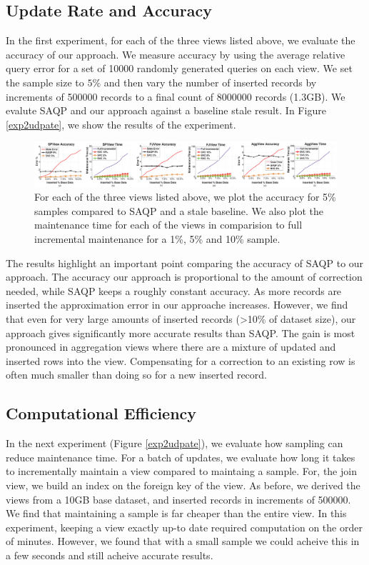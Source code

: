\subsection{Update Rate and Accuracy}
In the first experiment, for each of the three views listed above, we evaluate the accuracy of our approach.
We measure accuracy by using the average relative query error for a set of 10000 randomly generated queries on each view.
We set the sample size to $5\%$ and then vary the number of inserted records by increments of 500000 records to a final count of 8000000 records (1.3GB).
We evalute SAQP and our approach against a baseline stale result.
In Figure \ref{exp2udpate}, we show the results of the experiment. 

\begin{figure}[ht!]
\label{exp2update}
\centering
 \includegraphics[scale=0.30]{exp/exp2-full.eps}
 \caption{For each of the three views listed above, we plot the accuracy for 5\% samples compared to SAQP and a stale baseline. We also plot the maintenance time for each of the views in comparision to full incremental maintenance for a 1\%, 5\% and 10\% sample. }
\end{figure}

The results highlight an important point comparing the accuracy of SAQP to our approach. 
The accuracy our approach is proportional to the amount of correction needed, while SAQP keeps a roughly constant accuracy.
As more records are inserted the approximation error in our approache increases.
However, we find that even for very large amounts of inserted records (>10\% of dataset size), our approach gives significantly more accurate results
than SAQP.
The gain is most pronounced in aggregation views where there are a mixture of updated and inserted rows into the view.
Compensating for a correction to an existing row is often much smaller than doing so for a new inserted record.


\subsection{Computational Efficiency}
In the next experiment (Figure \ref{exp2udpate}), we evaluate how sampling can reduce maintenance time.
For a batch of updates, we evaluate how long it takes to incrementally maintain a view compared to maintaing a sample.
For, the join view, we build an index on the foreign key of the view.
As before, we derived the views from a 10GB base dataset, and inserted records in increments of 500000.
We find that maintaining a sample is far cheaper than the entire view. In this experiment, keeping a view exactly up-to date required computation on the order of minutes.
However, we found that with a small sample we could acheive this in a few seconds and still acheive accurate results.

